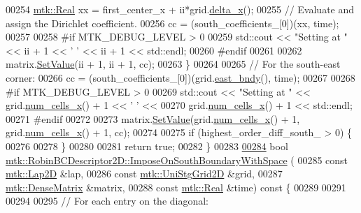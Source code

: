 \begin{DoxyCode}
00254     \hyperlink{group__c01-roots_gac080bbbf5cbb5502c9f00405f894857d}{mtk::Real} xx = first\_center\_x + ii*grid.\hyperlink{classmtk_1_1UniStgGrid2D_aca4710004c4a7da6a9e8fd6ab32a691f}{delta\_x}();
00255     \textcolor{comment}{// Evaluate and assign the Dirichlet coefficient.}
00256     cc = (south\_coefficients\_[0])(xx, time);
00257 
00258 \textcolor{preprocessor}{    #if MTK\_DEBUG\_LEVEL > 0}
00259     std::cout << \textcolor{stringliteral}{"Setting at "} << ii + 1 << \textcolor{charliteral}{' '} << ii + 1 << std::endl;
00260 \textcolor{preprocessor}{    #endif}
00261 
00262     matrix.\hyperlink{classmtk_1_1DenseMatrix_a784ce5784109ac86bfb9d8562b334b13}{SetValue}(ii + 1, ii + 1, cc);
00263   \}
00264 
00265   \textcolor{comment}{// For the south-east corner:}
00266   cc = (south\_coefficients\_[0])(grid.\hyperlink{classmtk_1_1UniStgGrid2D_a03f689eb29a6369b82ce1207c655d5ff}{east\_bndy}(), time);
00267 
00268 \textcolor{preprocessor}{  #if MTK\_DEBUG\_LEVEL > 0}
00269   std::cout << \textcolor{stringliteral}{"Setting at "} << grid.\hyperlink{classmtk_1_1UniStgGrid2D_a2d182866a398aba8e4829590e85bf939}{num\_cells\_x}() + 1 << \textcolor{charliteral}{' '} <<
00270     grid.\hyperlink{classmtk_1_1UniStgGrid2D_a2d182866a398aba8e4829590e85bf939}{num\_cells\_x}() + 1 << std::endl;
00271 \textcolor{preprocessor}{  #endif}
00272 
00273   matrix.\hyperlink{classmtk_1_1DenseMatrix_a784ce5784109ac86bfb9d8562b334b13}{SetValue}(grid.\hyperlink{classmtk_1_1UniStgGrid2D_a2d182866a398aba8e4829590e85bf939}{num\_cells\_x}() + 1, grid.\hyperlink{classmtk_1_1UniStgGrid2D_a2d182866a398aba8e4829590e85bf939}{num\_cells\_x}() + 1, cc);
00274 
00275   \textcolor{keywordflow}{if} (highest\_order\_diff\_south\_ > 0) \{
00276 
00278   \}
00280 
00281   \textcolor{keywordflow}{return} \textcolor{keyword}{true};
00282 \}
00283 
\hypertarget{mtk__robin__bc__descriptor__2d_8cc_source_l00284}{}\hyperlink{classmtk_1_1RobinBCDescriptor2D_a2f99cdd8bda2bc46cf259bb96ef4bd49}{00284} \textcolor{keywordtype}{bool} \hyperlink{classmtk_1_1RobinBCDescriptor2D_a2f99cdd8bda2bc46cf259bb96ef4bd49}{mtk::RobinBCDescriptor2D::ImposeOnSouthBoundaryWithSpace}
      (
00285     \textcolor{keyword}{const} \hyperlink{classmtk_1_1Lap2D}{mtk::Lap2D} &lap,
00286     \textcolor{keyword}{const} \hyperlink{classmtk_1_1UniStgGrid2D}{mtk::UniStgGrid2D} &grid,
00287     \hyperlink{classmtk_1_1DenseMatrix}{mtk::DenseMatrix} &matrix,
00288     \textcolor{keyword}{const} \hyperlink{group__c01-roots_gac080bbbf5cbb5502c9f00405f894857d}{mtk::Real} &time)\textcolor{keyword}{ const }\{
00289 
00291 
00294 
00295   \textcolor{comment}{// For each entry on the diagonal:}

\end{DoxyCode}
